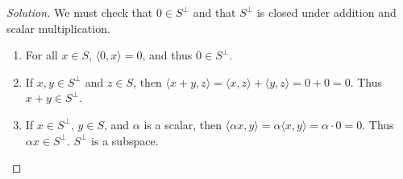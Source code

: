     \begin{proof}[Solution]
    We must check that $0\in S^{\perp}$ and that $S^{\perp}$ is closed under addition and scalar multiplication.
    \begin{enumerate}
        \item For all $x\in S$, $\langle 0,x \rangle = 0$, and thus $0\in S^{\perp}$.
        \item If $x,y\in S^{\perp}$ and $z\in S$, then $\langle x+y,z\rangle = \langle x,z\rangle + \langle y,z\rangle = 0+0=0$. Thus $x+y\in S^{\perp}$.
        \item If $x\in S^{\perp}$, $y\in S$, and $\alpha$ is a scalar, then $\langle \alpha x,y \rangle = \alpha \langle x,y \rangle = \alpha \cdot 0 = 0$. Thus $\alpha x \in S^{\perp}$. $S^{\perp}$ is a subspace.
    \end{enumerate}
    \end{proof}